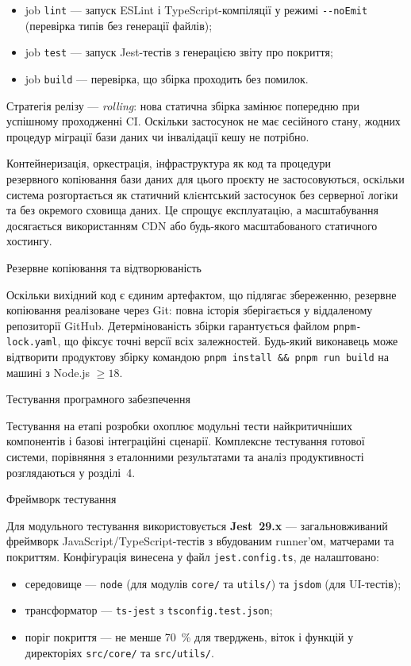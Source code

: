 \begin{itemize}
\item
  job \texttt{lint} --- запуск ESLint і TypeScript-компіляції у режимі
  \texttt{-\/-noEmit} (перевірка типів без генерації файлів);
\item
  job \texttt{test} --- запуск Jest-тестів з генерацією звіту про
  покриття;
\item
  job \texttt{build} --- перевірка, що збірка проходить без помилок.
\end{itemize}

Стратегія релізу --- \emph{rolling}: нова статична збірка замінює
попередню при успішному проходженні CI. Оскільки застосунок не має
сесійного стану, жодних процедур міграції бази даних чи інвалідації кешу
не потрібно.

Контейнеризацiя, оркестрацiя, iнфраструктура як код та процедури\\
резервного копiювання бази даних для цього проєкту не застосовуються,
оскiльки система розгортається як статичний клiєнтський застосунок без
серверної логiки та без окремого сховища даних. Це спрощує експлуатацiю,
а масштабування досягається використанням CDN або будь-якого
масштабованого статичного хостингу.

Резервне копіювання та відтворюваність

Оскільки вихідний код є єдиним артефактом, що підлягає збереженню,
резервне копіювання реалізоване через Git: повна історія зберігається у
віддаленому репозиторії GitHub. Детермінованість збірки гарантується
файлом \texttt{pnpm-lock.yaml}, що фіксує точні версії всіх залежностей.
Будь-який виконавець може відтворити продуктову збірку командою
\texttt{pnpm\ install\ \&\&\ pnpm\ run\ build} на машині з Node.js
\(\geq 18\).

\protect{}\label{_Toc229681157}{}Тестування програмного
забезпечення

Тестування на етапі розробки охоплює модульні тести найкритичніших
компонентів і базові інтеграційні сценарії. Комплексне тестування
готової системи, порівняння з еталонними результатами та аналіз
продуктивності розглядаються у розділі~4.

Фреймворк тестування

Для модульного тестування використовується \textbf{Jest~29.x} ---
загальновживаний фреймворк JavaScript/TypeScript-тестів з вбудованим
runner'ом, матчерами та покриттям. Конфігурація винесена у файл
\texttt{jest.config.ts}, де налаштовано:

\begin{itemize}
\item
  середовище --- \texttt{node} (для модулів \texttt{core/} та
  \texttt{utils/}) та \texttt{jsdom} (для UI-тестів);
\item
  трансформатор --- \texttt{ts-jest} з \texttt{tsconfig.test.json};
\item
  поріг покриття --- не менше 70~\% для тверджень, віток і функцій у
  директоріях \texttt{src/core/} та \texttt{src/utils/}.
\end{itemize}

